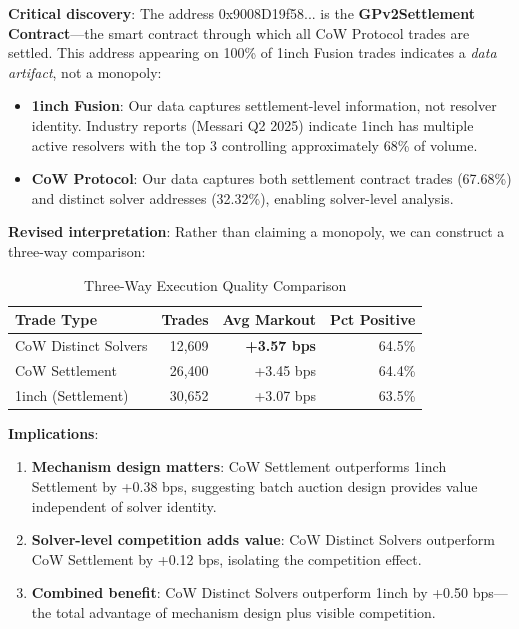 \documentclass[12pt,a4paper]{article}
\begin{document}
\textbf{Critical discovery}: The address 0x9008D19f58... is the \textbf{GPv2Settlement Contract}---the smart contract through which all CoW Protocol trades are settled. This address appearing on 100\% of 1inch Fusion trades indicates a \textit{data artifact}, not a monopoly:

\begin{itemize}
    \item \textbf{1inch Fusion}: Our data captures settlement-level information, not resolver identity. Industry reports (Messari Q2 2025) indicate 1inch has multiple active resolvers with the top 3 controlling approximately 68\% of volume.
    \item \textbf{CoW Protocol}: Our data captures both settlement contract trades (67.68\%) and distinct solver addresses (32.32\%), enabling solver-level analysis.
\end{itemize}

\textbf{Revised interpretation}: Rather than claiming a monopoly, we can construct a three-way comparison:

\begin{table}[H]
\centering
\caption{Three-Way Execution Quality Comparison}
\label{tab:threeway}
\begin{tabular}{lrrr}
\toprule
\textbf{Trade Type} & \textbf{Trades} & \textbf{Avg Markout} & \textbf{Pct Positive} \\
\midrule
CoW Distinct Solvers & 12,609 & \textbf{+3.57 bps} & 64.5\% \\
CoW Settlement & 26,400 & +3.45 bps & 64.4\% \\
1inch (Settlement) & 30,652 & +3.07 bps & 63.5\% \\
\bottomrule
\end{tabular}
\end{table}

\textbf{Implications}:
\begin{enumerate}
    \item \textbf{Mechanism design matters}: CoW Settlement outperforms 1inch Settlement by +0.38 bps, suggesting batch auction design provides value independent of solver identity.
    \item \textbf{Solver-level competition adds value}: CoW Distinct Solvers outperform CoW Settlement by +0.12 bps, isolating the competition effect.
    \item \textbf{Combined benefit}: CoW Distinct Solvers outperform 1inch by +0.50 bps---the total advantage of mechanism design plus visible competition.
\end{enumerate}
\end{document}
